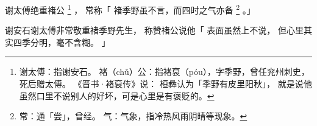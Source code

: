 
\switchcolumn*[\section{}]

谢太傅绝重褚公%
\footnote{%
    谢太傅：指谢安石。
    褚（chǔ）公：指褚裒（póu），字季野，曾任兖州刺史，死后赠太傅。
            《晋书·褚裒传》说：
            桓彝认为「季野有皮里阳秋」，
            就是说他虽然口里不说别人的好坏，可是心里是有褒贬的。
}%
，
常称「
    褚季野虽不言，而四时之气亦备%
    \footnote{%
        常：通「尝」，曾经。
        气：气象，指冷热风雨阴晴等现象。
    }%
。」

\switchcolumn

谢安石谢太傅非常敬重禇季野先生，
称赞禇公说他「
    表面虽然上不说，
    但心里其实四季分明，毫不含糊。
」

